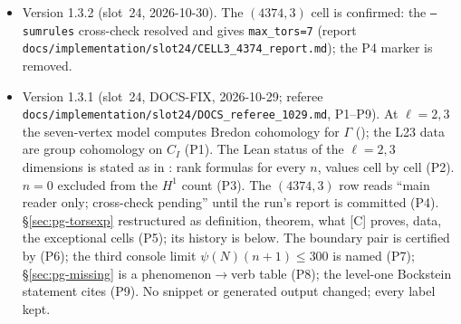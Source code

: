 \documentclass[11pt]{article}
\newcommand{\Ga}{\Gamma}
\newcommand{\code}[1]{\texttt{#1}}
\newcommand{\file}[1]{\texttt{#1}}
\newcommand{\pfile}[1]{\nolinkurl{#1}}
\begin{document}
\begin{itemize}[leftmargin=1.6em,itemsep=2pt]
  at $\ell=59$, $67$, $139$; the saturation defect to $\delta=190$, and $\delta=182$ final at $(700,7)$; the ordinary rows re-joined to the
  records; the DEEP-1 counts as distinct cells ($2158$, $128$) rather than computations ($2575$, $146$). The section label
  \code{sec:pg-census34} is kept (alias \code{sec:pg-census40}). No snippet changed; all twenty outputs regenerated on the slot-25 binary are
  byte-identical (only \file{costs.tex} moved).
\item Version 1.3.2 (slot~24, 2026-10-30). The $(4374,3)$ cell is confirmed: the \code{--sumrules} cross-check resolved and gives \code{max\_tors=7} (report \pfile{docs/implementation/slot24/CELL3_4374_report.md}); the P4 marker is removed.
\item Version 1.3.1 (slot~24, DOCS-FIX, 2026-10-29; referee \pfile{docs/implementation/slot24/DOCS_referee_1029.md}, P1--P9). At
  $\ell=2,3$ the seven-vertex model computes Bredon cohomology for $\Ga$ ({}); the L23 data are group
  cohomology on $C_I$ (P1). The Lean status of the $\ell=2,3$ dimensions is stated as in {}: rank formulas for
  every $n$, values cell by cell (P2). $n=0$ excluded from the $H^{1}$ count (P3). The $(4374,3)$ row reads ``main reader only; cross-check
  pending'' until the run's report is committed (P4). \S\ref{sec:pg-torsexp} restructured as definition, theorem, what [C] proves, data, the
  exceptional cells (P5); its history is below. The boundary pair is certified by {} (P6); the third console limit
  $\psi(N)(n+1)\le300$ is named (P7); \S\ref{sec:pg-missing} is a phenomenon$\to$verb table (P8); the level-one Bockstein statement cites
  {} (P9). No snippet or generated output changed; every label kept.


\end{itemize}
\end{document}
